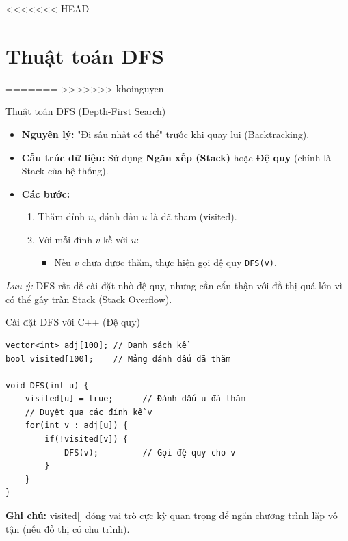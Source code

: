 <<<<<<< HEAD
\section{Thuật toán DFS}
=======
>>>>>>> khoinguyen
\begin{frame}{Thuật toán DFS (Depth-First Search)}
    \begin{itemize}
        \item \textbf{Nguyên lý:} "Đi sâu nhất có thể" trước khi quay lui (Backtracking).
        \item \textbf{Cấu trúc dữ liệu:} Sử dụng \textbf{Ngăn xếp (Stack)} hoặc \textbf{Đệ quy} (chính là Stack của hệ thống).
        \item \textbf{Các bước:}
        \begin{enumerate}
            \item Thăm đỉnh $u$, đánh dấu $u$ là đã thăm (visited).
            \item Với mỗi đỉnh $v$ kề với $u$:
            \begin{itemize}
                \item Nếu $v$ chưa được thăm, thực hiện gọi đệ quy \texttt{DFS(v)}.
            \end{itemize}
        \end{enumerate}
    \end{itemize}
    \vspace{0.2cm}
    \textit{Lưu ý:} DFS rất dễ cài đặt nhờ đệ quy, nhưng cần cẩn thận với đồ thị quá lớn vì có thể gây tràn Stack (Stack Overflow).
\end{frame}
\begin{frame}[fragile]{Cài đặt DFS với C++ (Đệ quy)}
\begin{verbatim}
vector<int> adj[100]; // Danh sách kề
bool visited[100];    // Mảng đánh dấu đã thăm

void DFS(int u) {
    visited[u] = true;      // Đánh dấu u đã thăm
    // Duyệt qua các đỉnh kề v
    for(int v : adj[u]) {
        if(!visited[v]) {
            DFS(v);         // Gọi đệ quy cho v
        }
    }
}
\end{verbatim}
\textbf{Ghi chú:} visited[] đóng vai trò cực kỳ quan trọng để ngăn chương trình lặp vô tận (nếu đồ thị có chu trình).
\end{frame}